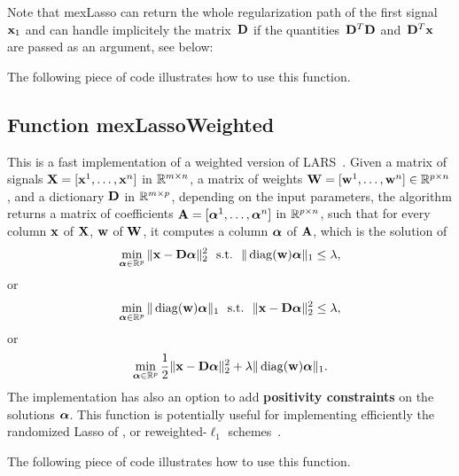 \documentclass[a4paper, 11pt]{article}
\begin{document}
   Note that mexLasso can return the whole regularization path of the first signal ${\mathbf x}_1$ 
   and can handle implicitely the matrix~${\mathbf D}$ if the quantities~${\mathbf D}^T{\mathbf D}$ and~${\mathbf D}^T{\mathbf x}$ are passed
   as an argument, see below:

%    

The following piece of code illustrates how to use this function.



\subsection{Function mexLassoWeighted}
This is a fast implementation of a weighted version of LARS~\cite{efron}. Given a matrix of signals ${\mathbf X}=[{\mathbf x}^1,\ldots,{\mathbf x}^n]$  in ${\mathbb R}^{m \times n}$, a matrix of weights ${\mathbf W}=[{\mathbf w}^1,\ldots,{\mathbf w}^n] \in {\mathbb R}^{p \times n}$, and a dictionary ${\mathbf D}$ in ${\mathbb R}^{m \times p}$, depending on the input parameters, the algorithm returns a matrix of coefficients ${\mathbf A}=[{\boldsymbol\alpha}^1,\ldots,{\boldsymbol\alpha}^n]$ in ${\mathbb R}^{p \times n}$,
     such that for every column ${\mathbf x}$ of ${\mathbf X}$, ${\mathbf w}$ of ${\mathbf W}$, it computes a column ${\boldsymbol\alpha}$ of ${\mathbf A}$,  which is the solution of
     \begin{equation}
     \min_{{\boldsymbol\alpha} \in {\mathbb R}^p} \|{\mathbf x}-{\mathbf D}{\boldsymbol\alpha}\|_2^2 ~~\text{s.t.}~~ \|\operatorname{diag}({\mathbf w}){\boldsymbol\alpha}\|_1 \leq \lambda,
     \end{equation}
     or 
     \begin{equation}
     \min_{{\boldsymbol\alpha} \in {\mathbb R}^p}  \|\operatorname{diag}({\mathbf w}){\boldsymbol\alpha}\|_1 ~~\text{s.t.}~~ \|{\mathbf x}-{\mathbf D}{\boldsymbol\alpha}\|_2^2 \leq \lambda,
     \end{equation}
     or
     \begin{equation}
     \min_{{\boldsymbol\alpha} \in {\mathbb R}^p} \frac{1}{2}\|{\mathbf x}-{\mathbf D}{\boldsymbol\alpha}\|_2^2 + \lambda \|\operatorname{diag}({\mathbf w}){\boldsymbol\alpha}\|_1.
     \end{equation}
     The implementation has also an option to add {\bf positivity constraints} on
     the solutions ${\boldsymbol\alpha}$.  This function is potentially useful for
     implementing efficiently the randomized Lasso of \cite{meinshausen}, or reweighted-$\ell_1$ schemes~\cite{candes4}.

%    

The following piece of code illustrates how to use this function.

\end{document}

